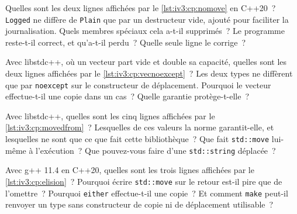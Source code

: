 \begin{question}\label{iq:iv3:cpp:14}
Quelles sont les deux lignes affichées par le \cref{lst:iv3:cp:nomove} en C++20~? \texttt{Logged} ne diffère de \texttt{Plain} que par un destructeur vide, ajouté pour faciliter la journalisation. Quels membres spéciaux cela a-t-il supprimés~? Le programme reste-t-il correct, et qu'a-t-il perdu~? Quelle seule ligne le corrige~?
\label{lst:iv3:cp:nomove}
\end{question}

\begin{question}\label{iq:iv3:cpp:15}
Avec libstdc++, où un vecteur part vide et double sa capacité, quelles sont les deux lignes affichées par le \cref{lst:iv3:cp:vecnoexcept}~? Les deux types ne diffèrent que par \texttt{noexcept} sur le constructeur de déplacement. Pourquoi le vecteur effectue-t-il une copie dans un cas~? Quelle garantie protège-t-elle~?
\label{lst:iv3:cp:vecnoexcept}
\end{question}

\begin{question}\label{iq:iv3:cpp:16}
Avec libstdc++, quelles sont les cinq lignes affichées par le \cref{lst:iv3:cp:movedfrom}~? Lesquelles de ces valeurs la norme garantit-elle, et lesquelles ne sont que ce que fait cette bibliothèque~? Que fait \texttt{std::move} lui-même à l'exécution~? Que pouvez-vous faire d'une \texttt{std::string} déplacée~?
\label{lst:iv3:cp:movedfrom}
\end{question}

\begin{question}\label{iq:iv3:cpp:17}
Avec g++ 11.4 en C++20, quelles sont les trois lignes affichées par le \cref{lst:iv3:cp:elision}~? Pourquoi écrire \texttt{std::move} sur le retour est-il pire que de l'omettre~? Pourquoi \texttt{either} effectue-t-il une copie~? Et comment \texttt{make} peut-il renvoyer un type sans constructeur de copie ni de déplacement utilisable~?
\label{lst:iv3:cp:elision}
\end{question}


